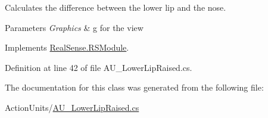 Calculates the difference between the lower lip and the nose. 
\begin{DoxyParams}{Parameters}
{\em Graphics} & g for the view \\
\hline
\end{DoxyParams}


Implements \hyperlink{class_real_sense_1_1_r_s_module_a2ec830b7932ee7c0077d473f81c73867}{Real\+Sense.\+R\+S\+Module}.



Definition at line 42 of file A\+U\+\_\+\+Lower\+Lip\+Raised.\+cs.



The documentation for this class was generated from the following file\+:\begin{DoxyCompactItemize}
\item 
Action\+Units/\hyperlink{_a_u___lower_lip_raised_8cs}{A\+U\+\_\+\+Lower\+Lip\+Raised.\+cs}\end{DoxyCompactItemize}
